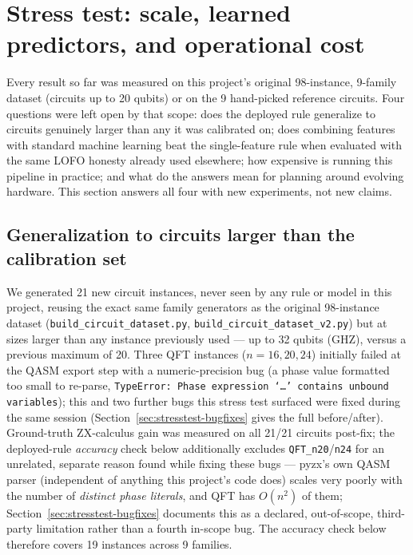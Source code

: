 \documentclass[9pt,twocolumn]{extarticle}
\begin{document}
\section{Stress test: scale, learned predictors, and operational cost}
\label{sec:stresstest}
Every result so far was measured on this project's original 98-instance,
9-family dataset (circuits up to 20 qubits) or on the 9 hand-picked
reference circuits. Four questions were left open by that scope: does the
deployed rule generalize to circuits genuinely larger than any it was
calibrated on; does combining features with standard machine learning beat
the single-feature rule when evaluated with the same LOFO honesty already
used elsewhere; how expensive is running this pipeline in practice; and what
do the answers mean for planning around evolving hardware. This section
answers all four with new experiments, not new claims.

\subsection{Generalization to circuits larger than the calibration set}
\label{sec:stresstest-scale}
We generated 21 new circuit instances, never seen by any rule or model in
this project, reusing the exact same family generators as the original
98-instance dataset (\texttt{build\_circuit\_dataset.py},
\texttt{build\_circuit\_dataset\_v2.py}) but at sizes larger than any
instance previously used --- up to 32 qubits (GHZ), versus a previous
maximum of 20. Three QFT instances ($n{=}16,20,24$) initially failed at the
QASM export step with a numeric-precision bug (a phase value formatted too
small to re-parse, \texttt{TypeError: Phase expression `\ldots' contains
unbound variables}); this and two further bugs this stress test surfaced
were fixed during the same session (Section~\ref{sec:stresstest-bugfixes}
gives the full before/after). Ground-truth ZX-calculus gain was measured
on all 21/21 circuits post-fix; the deployed-rule \emph{accuracy} check
below additionally excludes \texttt{QFT\_n20}/\texttt{n24} for an
unrelated, separate reason found while fixing these bugs --- pyzx's own
QASM parser (independent of anything this project's code does) scales
very poorly with the number of \emph{distinct phase literals}, and QFT has
$O(n^2)$ of them; Section~\ref{sec:stresstest-bugfixes} documents this as
a declared, out-of-scope, third-party limitation rather than a fourth
in-scope bug. The accuracy check below therefore covers 19 instances
across 9 families.
\end{document}
